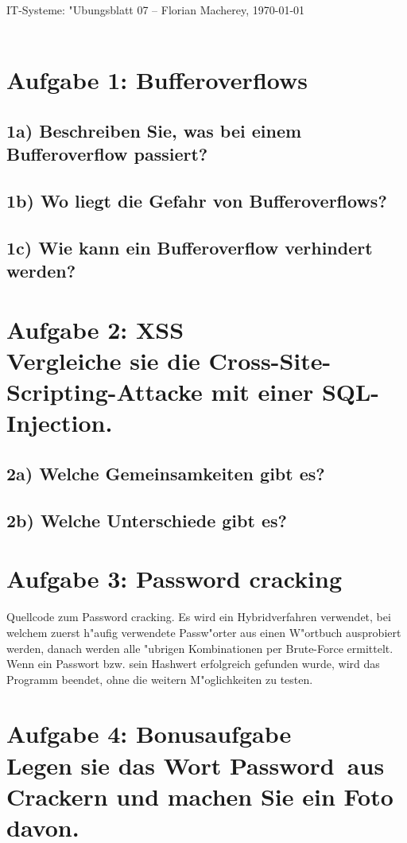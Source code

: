 \documentclass{scrartcl}
\begin{document}
{\Large \centering \textsf{IT-Systeme: "Ubungsblatt 07} -- Florian Macherey, 
\today}\\
\noindent\makebox[\linewidth]{\rule{\textwidth}{0.2pt}} \\


\section*{Aufgabe 1: Bufferoverflows}
\subsection*{1a) Beschreiben Sie, was bei einem Bufferoverflow passiert?}
\subsection*{1b) Wo liegt die Gefahr von Bufferoverflows?} 
\subsection*{1c) Wie kann ein Bufferoverflow verhindert werden?}

\section*{Aufgabe 2: XSS \\Vergleiche sie die Cross-Site-Scripting-Attacke mit einer SQL-Injection.}
\subsection*{2a) Welche Gemeinsamkeiten gibt es?}
\subsection*{2b) Welche Unterschiede gibt es?}

\section*{Aufgabe 3: Password cracking }
Quellcode zum Password cracking. Es wird ein Hybridverfahren verwendet, bei welchem zuerst h"aufig verwendete Passw"orter aus einen W"ortbuch ausprobiert werden, danach werden alle "ubrigen Kombinationen per Brute-Force ermittelt. Wenn ein Passwort bzw. sein Hashwert erfolgreich gefunden wurde, wird das Programm beendet, ohne die weitern M"oglichkeiten zu testen.


\section*{Aufgabe 4: Bonusaufgabe \\Legen sie das Wort \dq Password\dq ~aus Crackern und machen Sie ein Foto davon.}
\end{document}
